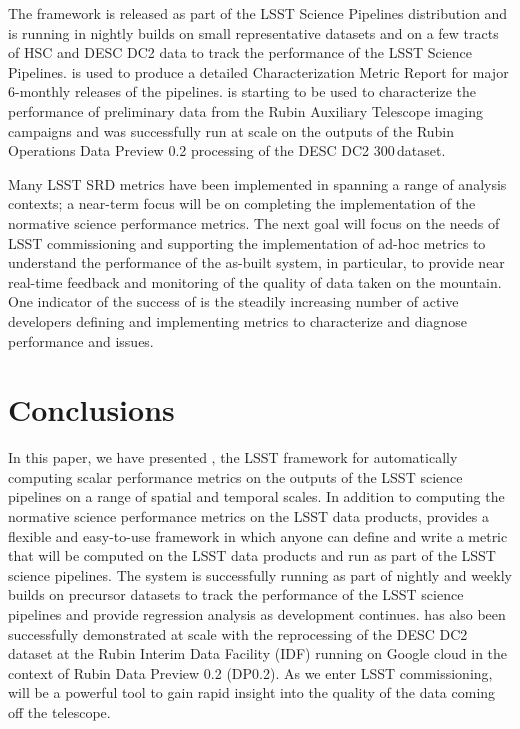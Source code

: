 The \faro framework is released as part of the LSST Science Pipelines distribution and is running in nightly builds on small representative datasets and on a few tracts of HSC and DESC DC2 data to track the performance of the LSST Science Pipelines.
\faro is used to produce a detailed Characterization Metric Report for major 6-monthly releases of the pipelines. 
\faro is starting to be used to characterize the performance of preliminary data from the Rubin Auxiliary Telescope imaging campaigns and was successfully run at scale on the outputs of the Rubin Operations Data Preview 0.2 processing of the DESC DC2 300\,\degsq dataset.

Many LSST SRD metrics have been implemented in \faro spanning a range of analysis contexts; a near-term focus will be on completing the implementation of the normative science performance metrics.
The next goal will focus on the needs of LSST commissioning and supporting the implementation of ad-hoc metrics to understand the performance of the as-built system, in particular, to provide near real-time feedback and monitoring of the quality of data taken on the mountain.
One indicator of the success of \faro is the steadily increasing number of active developers defining and implementing metrics to characterize and diagnose performance and issues.

\section{Conclusions} \label{sec:conclusions}

In this paper, we have presented \faro, the LSST framework for automatically computing scalar performance metrics on the outputs of the LSST science pipelines on a range of spatial and temporal scales.
In addition to computing the normative science performance metrics on the LSST data products, \faro provides a flexible and easy-to-use framework in which anyone can define and write a metric that will be computed on the LSST data products and run as part of the LSST science pipelines. 
The system is successfully running as part of nightly and weekly builds on precursor datasets to track the performance of the LSST science pipelines and provide regression analysis as development continues. 
\faro has also been successfully demonstrated at scale with the reprocessing of the DESC DC2 dataset \cite{2021ApJS..253...31L} at the Rubin Interim Data Facility (IDF) running on Google cloud \cite{2021arXiv211115030O} in the context of Rubin Data Preview 0.2 (DP0.2)\cite{RTN-001}. 
As we enter LSST commissioning, \faro will be a powerful tool to gain rapid insight into the quality of the data coming off the telescope. 
